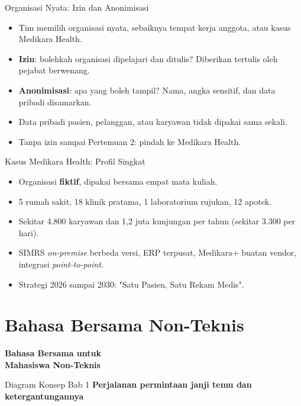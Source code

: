 \documentclass[aspectratio=169, table, 12pt]{beamer}
\begin{document}
\begin{frame}{Organisasi Nyata: Izin dan Anonimisasi}
  \begin{itemize}
    \item Tim memilih organisasi nyata, sebaiknya tempat kerja anggota, atau kasus
          Medikara Health.
    \item \textbf{Izin}: bolehkah organisasi dipelajari dan ditulis? Diberikan
          tertulis oleh pejabat berwenang.
    \item \textbf{Anonimisasi}: apa yang boleh tampil? Nama, angka sensitif, dan
          data pribadi disamarkan.
    \item Data pribadi pasien, pelanggan, atau karyawan tidak dipakai sama sekali.
    \item Tanpa izin sampai Pertemuan 2: pindah ke Medikara Health.
  \end{itemize}
\end{frame}

\begin{frame}{Kasus Medikara Health: Profil Singkat}
  \begin{itemize}
    \item Organisasi \textbf{fiktif}, dipakai bersama empat mata kuliah.
    \item 5 rumah sakit, 18 klinik pratama, 1 laboratorium rujukan, 12 apotek.
    \item Sekitar 4.800 karyawan dan 1,2 juta kunjungan per tahun (sekitar 3.300 per
          hari).
    \item SIMRS \textit{on-premise} berbeda versi, ERP terpusat, Medikara+ buatan
          vendor, integrasi \textit{point-to-point}.
    \item Strategi 2026 sampai 2030: "Satu Pasien, Satu Rekam Medis".
  \end{itemize}
\end{frame}

\section{Bahasa Bersama Non-Teknis}

\begin{frame}{\hfill}
  \centering
  \Huge{\textbf{Bahasa Bersama untuk\\Mahasiswa Non-Teknis}}
\end{frame}

\begin{frame}{{\Large Diagram Konsep Bab 1}}
  \centering
  {\small\bfseries Perjalanan permintaan janji temu dan ketergantungannya}\par\medskip
\end{frame}
\end{document}
